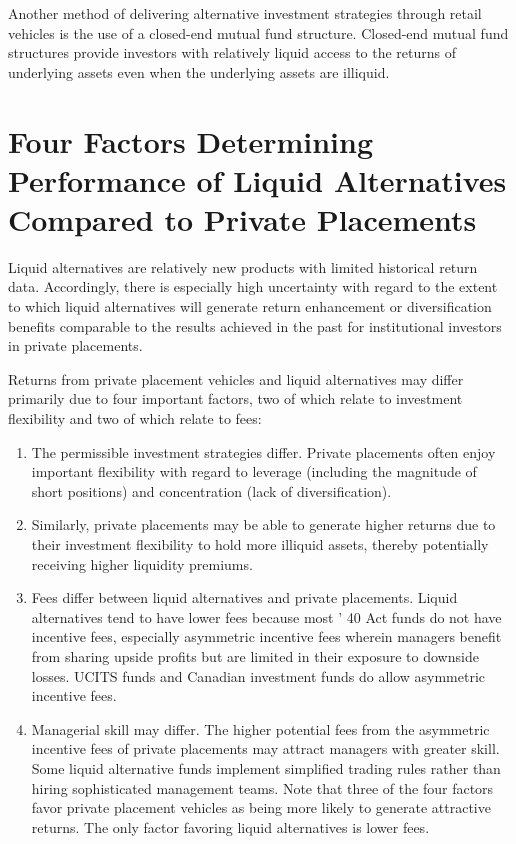 \documentclass[11pt]{article}
\begin{document}
Another method of delivering alternative investment strategies through retail vehicles is the use of a closed-end mutual fund structure. Closed-end mutual fund structures provide investors with relatively liquid access to the returns of underlying assets even when the underlying assets are illiquid.

\section*{Four Factors Determining Performance of Liquid Alternatives Compared to Private Placements}
Liquid alternatives are relatively new products with limited historical return data. Accordingly, there is especially high uncertainty with regard to the extent to which liquid alternatives will generate return enhancement or diversification benefits comparable to the results achieved in the past for institutional investors in private placements.

Returns from private placement vehicles and liquid alternatives may differ primarily due to four important factors, two of which relate to investment flexibility and two of which relate to fees:

\begin{enumerate}
  \item The permissible investment strategies differ. Private placements often enjoy important flexibility with regard to leverage (including the magnitude of short positions) and concentration (lack of diversification).

  \item Similarly, private placements may be able to generate higher returns due to their investment flexibility to hold more illiquid assets, thereby potentially receiving higher liquidity premiums.

  \item Fees differ between liquid alternatives and private placements. Liquid alternatives tend to have lower fees because most ' 40 Act funds do not have incentive fees, especially asymmetric incentive fees wherein managers benefit from sharing upside profits but are limited in their exposure to downside losses. UCITS funds and Canadian investment funds do allow asymmetric incentive fees.

  \item Managerial skill may differ. The higher potential fees from the asymmetric incentive fees of private placements may attract managers with greater skill. Some liquid alternative funds implement simplified trading rules rather than hiring sophisticated management teams. Note that three of the four factors favor private placement vehicles as being more likely to generate attractive returns. The only factor favoring liquid alternatives is lower fees.

\end{enumerate}
\end{document}
